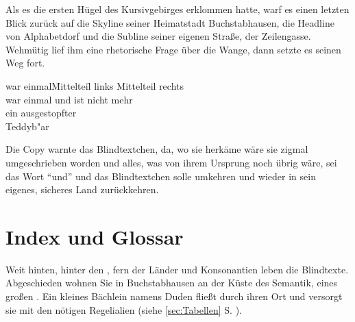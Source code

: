 \documentclass[%
	12pt,%
	a4paper,%
	oneside,%
	liststotoc, idxtotoc, bibtotoc, %
	parskip=half,%
	nochapterprefix,%
	appendixprefix, %
	headings=small,%
]{scrreprt}
\begin{document}
Als es die ersten Hügel des Kursivgebirges erklommen hatte, warf es einen letzten Blick zurück auf die Skyline seiner Heimatstadt Buchstabhausen, die Headline von Alphabetdorf und die Subline seiner eigenen Straße, der Zeilengasse. Wehmütig lief ihm eine rhetorische Frage über die Wange, dann setzte es seinen Weg fort.

\begin{tabbing}
war einmal\quad \= Mittelteil\quad \= \kill
links \> Mittelteil \> rechts\\
war einmal \> und ist \> nicht mehr\\
ein \>  \> ausgestopfter\\
 \>  \> Teddyb"ar
\end{tabbing}


Die Copy warnte das Blindtextchen, da, wo sie herkäme wäre sie zigmal umgeschrieben worden und alles, was von ihrem Ursprung noch übrig wäre, sei das Wort "`und"'  und das Blindtextchen solle umkehren und wieder in sein eigenes, sicheres Land zurückkehren.

\chapter{Index und Glossar}
\label{sec:Index}

Weit hinten, hinter den , fern der Länder  und Konsonantien leben die Blindtexte. Abgeschieden wohnen Sie in Buchstabhausen an der Küste%
des Semantik, eines großen . Ein  kleines Bächlein namens Duden fließt durch ihren Ort und versorgt sie mit den nötigen Regelialien (siehe \ref{sec:Tabellen} S. \pageref{sec:Tabellen}).




\end{document}
